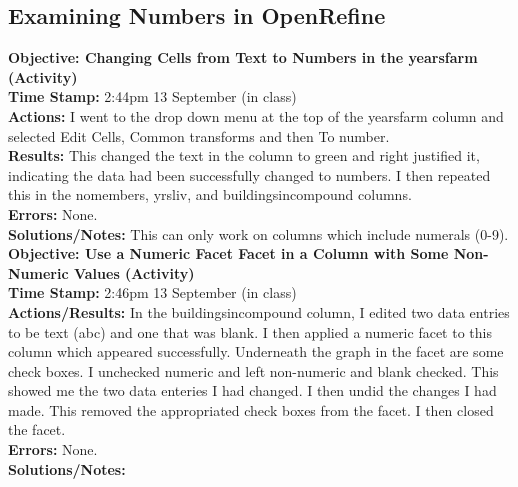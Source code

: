 \documentclass{article}
\begin{document}
\begin{FlushLeft}
\subsection{Examining Numbers in OpenRefine}\label{sec:numbers}
\textbf{Objective: Changing Cells from Text to Numbers in the years\textunderscore farm (Activity)}\\ 
\textbf{Time Stamp:} 2:44pm 13 September (in class)\\
\textbf{Actions:} I went to the drop down menu at the top of the years\textunderscore farm column and selected Edit Cells, Common transforms and then To number.\\
\textbf{Results:} This changed the text in the column to green and right justified it, indicating the data had been successfully changed to numbers. I then repeated this in the no\textunderscore members, yrs\textunderscore liv, and buildings\textunderscore in\textunderscore compound columns.\\
\textbf{Errors:} None.\\
\textbf{Solutions/Notes:} This can only work on columns which include numerals (0-9).\\
\vspace{5mm}
\textbf{Objective: Use a Numeric Facet Facet in a Column with Some Non-Numeric Values (Activity)}\\ 
\textbf{Time Stamp:} 2:46pm 13 September (in class)\\
\textbf{Actions/Results:} In the buildings\textunderscore in\textunderscore compound column, I edited two data entries to be text (abc) and one that was blank. I then applied a numeric facet to this column which appeared successfully. Underneath the graph in the facet are some check boxes. I unchecked numeric and left non-numeric and blank checked. This showed me the two data enteries I had changed. I then undid the changes I had made. This removed the appropriated check boxes from the facet. I then closed the facet.\\
\textbf{Errors:} None.\\
\textbf{Solutions/Notes:}\\
\vspace{5mm}


\end{FlushLeft}
\end{document}
